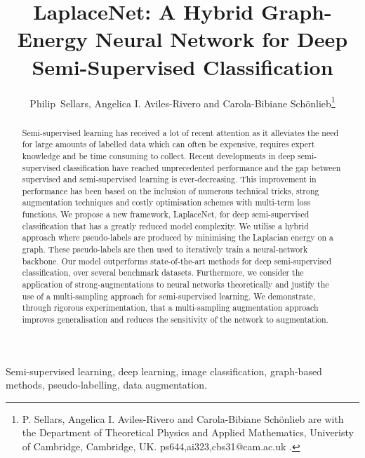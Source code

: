 \documentclass[journal]{IEEEtran}
\begin{document}
\title{LaplaceNet: A Hybrid Graph-Energy Neural  Network  for Deep Semi-Supervised Classification}

\author{Philip~Sellars, Angelica I. Aviles-Rivero and Carola-Bibiane Sch{\"o}nlieb\thanks{P. Sellars, Angelica I. Aviles-Rivero and  Carola-Bibiane Sch{\"o}nlieb are with the Department of Theoretical Physics and Applied Mathematics, Univeristy of Cambridge, Cambridge, UK.  {ps644,ai323,cbs31}@cam.ac.uk .}
}












\maketitle



\begin{abstract}
Semi-supervised learning has received a lot of recent attention as it alleviates the need for large amounts of labelled data which can often be expensive, requires expert knowledge and be time consuming to collect. Recent developments in deep semi-supervised classification have reached unprecedented performance and the gap between supervised and semi-supervised learning is ever-decreasing. This improvement in performance has been based on the inclusion of numerous technical tricks, strong augmentation techniques and costly optimisation schemes with multi-term loss functions. We propose a new framework, LaplaceNet, for deep semi-supervised classification that has a greatly reduced model complexity. We utilise a hybrid approach  where pseudo-labels are produced by minimising the Laplacian energy on a graph. These pseudo-labels are then used to iteratively train a neural-network backbone. Our model outperforms state-of-the-art methods for deep semi-supervised classification, over several benchmark datasets.   Furthermore, we consider the application of strong-augmentations to neural networks theoretically and justify the use of a multi-sampling approach for semi-supervised learning. We demonstrate, through rigorous experimentation, that a multi-sampling augmentation approach improves generalisation and reduces the sensitivity of the network to augmentation.
\end{abstract}

\begin{IEEEkeywords}
Semi-supervised learning, deep learning, image classification, graph-based methods, pseudo-labelling, data augmentation.
\end{IEEEkeywords}
\end{document}
